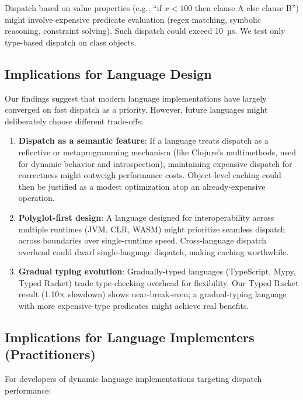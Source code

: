\documentclass[sigplan,final,acmsmall,review,screen]{acmart}
\begin{document}
Dispatch based on value properties (e.g., ``if $x < 100$ then clause A else clause B'') might involve expensive predicate evaluation
(regex matching, symbolic reasoning, constraint solving). Such dispatch could exceed 10~µs. We test only type-based dispatch on class objects.

\subsection{Implications for Language Design}

Our findings suggest that modern language implementations have largely converged on fast dispatch as a priority. However, future languages might
deliberately choose different trade-offs:

\begin{enumerate}
  \item \textbf{Dispatch as a semantic feature}: If a language treats dispatch as a reflective or metaprogramming mechanism (like Clojure's multimethods,
    used for dynamic behavior and introspection), maintaining expensive dispatch for correctness might outweigh performance costs. Object-level caching
    could then be justified as a modest optimization atop an already-expensive operation.

  \item \textbf{Polyglot-first design}: A language designed for interoperability across multiple runtimes (JVM, CLR, WASM) might prioritize seamless dispatch
    across boundaries over single-runtime speed. Cross-language dispatch overhead could dwarf single-language dispatch, making caching worthwhile.

  \item \textbf{Gradual typing evolution}: Gradually-typed languages (TypeScript, Mypy, Typed Racket) trade type-checking overhead for flexibility.
    Our Typed Racket result (1.10× slowdown) shows near-break-even; a gradual-typing language with more expensive type predicates might achieve real benefits.
\end{enumerate}

\subsection{Implications for Language Implementers (Practitioners)}

For developers of dynamic language implementations targeting dispatch performance:
\end{document}

